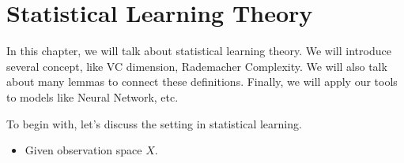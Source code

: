 \documentclass[../main.tex]{subfiles}
\begin{document}
	\chapter{Statistical Learning Theory}
	
	In this chapter, we will talk about statistical learning theory. We will introduce several concept, like VC dimension, Rademacher Complexity. We will also talk about many lemmas to connect these definitions. Finally, we will apply our tools to models like Neural Network, etc.
	
	To begin with, let's discuss the setting in statistical learning.
	
	\begin{itemize}
		\item Given observation space $X$.
	\end{itemize}
\end{document}
